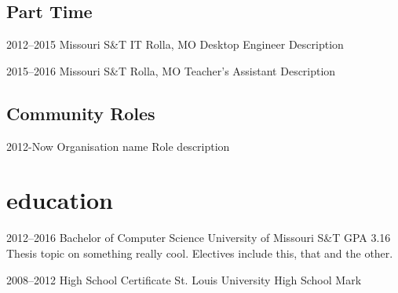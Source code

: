 \documentclass[]{friggeri-cv} %
\begin{document}
\subsection{Part Time}

\begin{entrylist}


\entry
{2012--2015}
{Missouri S\&T IT}
{Rolla, MO}
{Desktop Engineer}
{ 
Description
}

\entry
{2015--2016}
{Missouri S\&T}
{Rolla, MO}
{Teacher's Assistant}
{ 
Description
}



\end{entrylist}




\subsection{Community Roles}

\begin{entrylist}


\entry
{2012-Now}
{Organisation name} 
{}
{Role}
{
description
}




\end{entrylist}


\section{education}

\begin{entrylist} 


\entry
{2012--2016}
{Bachelor {\normalfont of Computer Science}}
{University of Missouri S\&T}
{GPA 3.16}
{
Thesis topic on something really cool. Electives include this, that and the other.
}


\entry
{2008--2012}  
{High School Certificate}
{St. Louis University High School}
{Mark} 
{
}


\end{entrylist}
\end{document}
